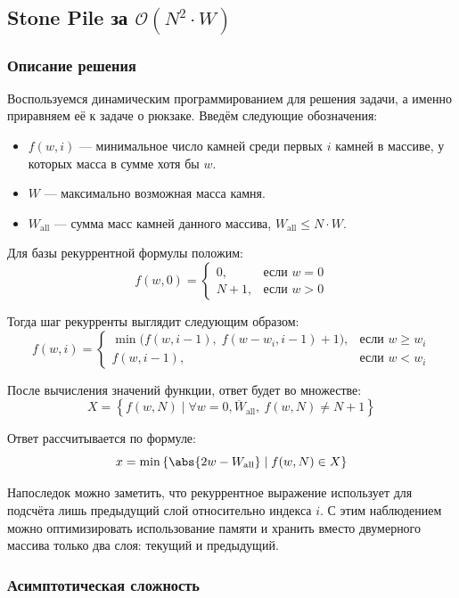\subsection{Stone Pile за $\mathcal{O}(N^2\cdot W)$}

\subsubsection{Описание решения}

Воспользуемся динамическим программированием для решения задачи, а именно приравняем её к задаче о рюкзаке. Введём следующие обозначения:
\begin{itemize}
  \item \( f(w,i) \) --- минимальное число камней среди первых \( i \) камней в массиве, у которых масса в сумме хотя бы \( w \).
  \item \( W \) --- максимально возможная масса камня.
  \item \( W_{\text{all}} \) --- сумма масс камней данного массива, \( W_{\text{all}}\leq N\cdot W \).
\end{itemize}

Для базы рекуррентной формулы положим:
\[
  f(w,0)=
  \begin{cases} 
    0, & \text{если } w = 0 \\
    N + 1, & \text{если } w > 0
  \end{cases}
\]

Тогда шаг рекурренты выглядит следующим образом:
\[
  f(w, i) = 
\begin{cases}
\min\bigl(f(w, i-1),\; f(w-w_i, i-1) + 1\bigr), & \text{если } w \geq w_i \\[4pt]
f(w, i-1), & \text{если } w < w_i
\end{cases}
\]

После вычисления значений функции, ответ будет во множестве:
\[
  X=\left\{f(w,N)\mid \forall w=\overline{0,W_{\text{all}}},\ f(w,N)\neq N+1\right\}
\]

Ответ рассчитывается по формуле:
\[
  x=\min\left\{\abs{2w-W_{\text{all}}}\mid f(w,N)\in X\right\}
\]

Напоследок можно заметить, что рекуррентное выражение использует для подсчёта лишь предыдущий слой относительно индекса \( i \). С этим наблюдением можно оптимизировать использование памяти и хранить вместо двумерного массива только два слоя: текущий и предыдущий.

\subsubsection{Асимптотическая сложность}

